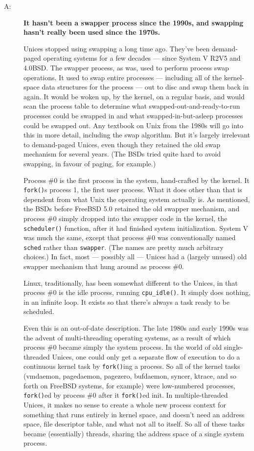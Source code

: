 \begin{description}
\item[A:] \textbf{It hasn't been a swapper process since the 1990s, and swapping hasn't really
  been used since the 1970s.}

  Unices stopped using swapping a long time ago. They've been demand-paged operating
  systems for a few decades --- since System V R2V5 and 4.0BSD. The swapper process, as was,
  used to perform process swap operations. It used to swap entire processes --- including
  all of the kernel-space data structures for the process --- out to disc and swap them back
  in again. It would be woken up, by the kernel, on a regular basis, and would scan the
  process table to determine what swapped-out-and-ready-to-run processes could be swapped
  in and what swapped-in-but-asleep processes could be swapped out. Any textbook on Unix
  from the 1980s will go into this in more detail, including the swap algorithm. But it's
  largely irrelevant to demand-paged Unices, even though they retained the old swap
  mechanism for several years. (The BSDs tried quite hard to avoid swapping, in favour of
  paging, for example.)

  Process \#0 is the first process in the system, hand-crafted by the kernel. It
  \texttt{fork()}s process 1, the first user process. What it does other than that is
  dependent from what Unix the operating system actually is. As mentioned, the BSDs before
  FreeBSD 5.0 retained the old swapper mechanism, and process \#0 simply dropped into the
  swapper code in the kernel, the \texttt{scheduler()} function, after it had finished
  system initialization. System V was much the same, except that process \#0 was
  conventionally named \texttt{sched} rather than \texttt{swapper}. (The names are pretty much
  arbitrary choices.) In fact, most --- possibly all --- Unices had a (largely unused) old
  swapper mechanism that hung around as process \#0.

  Linux, traditionally, has been somewhat different to the Unices, in that process \#0 is
  the idle process, running \texttt{cpu\_idle()}. It simply does nothing, in an infinite loop. It
  exists so that there's always a task ready to be scheduled.

  Even this is an out-of-date description. The late 1980s and early 1990s was the advent
  of multi-threading operating systems, as a result of which process \#0 became simply the
  system process. In the world of old single-threaded Unices, one could only get a
  separate flow of execution to do a continuous kernel task by \texttt{fork()}ing a
  process. So all of the kernel tasks (vmdaemon, pagedaemon, pagezero, bufdaemon, syncer,
  ktrace, and so forth on FreeBSD systems, for example) were low-numbered processes,
  \texttt{fork()}ed by process \#0 after it \texttt{fork()}ed init. In multiple-threaded
  Unices, it makes no sense to create a whole new process context for something that runs
  entirely in kernel space, and doesn't need an address space, file descriptor table, and
  what not all to itself. So all of these tasks became (essentially) threads, sharing the
  address space of a single system process.


\end{description}
